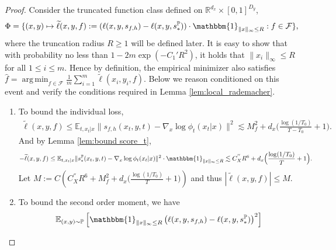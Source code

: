 \documentclass{article}
\numberwithin{equation}{section}
\newcommand{\E}{\mathbb{E}}
\newcommand{\R}{\mathbb{R}}
\DeclareMathOperator*{\argmin}{arg\,min}
\theoremstyle{definition}
\renewcommand{\P}{\mathbb{P}}
\begin{document}
\begin{proof}
    Consider the truncated function class defined on $\R^{d_x}\times[0,1]^{D_y}$,
    \begin{equation}
        \Phi=\{(x,y)\mapsto \widetilde{\ell}(x,y,f):=(\ell(x,y,s_{f,h})-\ell(x,y,s_*^\P))\cdot\mathbbm{1}_{\|x\|_\infty\leq R}:f\in\mathcal{F}\},
    \end{equation}
    where the truncation radius $R\geq 1$ will be defined later.
    It is easy to show that with probability no less than $1-2m\exp(-C_1'R^2)$, it holds that $\|x_i\|_\infty\leq R$ for all $1\leq i \leq m$.
    Hence by definition, the empirical minimizer also satisfies $\widehat{f}= \argmin_{f\in\mathcal{F}} \frac{1}{m}\sum_{i=1}^m \widetilde{\ell}(x_i,y_i,f)$.
    Below we reason conditioned on this event and verify the conditions required in Lemma \ref{lem:local_rademacher}. 
    \begin{enumerate}[label=\textbf{Step \arabic*.}]
        \item To bound the individual loss,
        \begin{equation}
            \begin{aligned}
                \widetilde{\ell}(x,y,f)
                \leq \E_{t,x_t|x}\|s_{f,h}(x_t,y,t)-\nabla_x\log \phi_t(x_t|x)\|^2
                \lesssim M_f^2+ d_x\Big(\frac{\log(1/T_0)}{T-T_0}+1\Big). 
            \end{aligned}
        \end{equation}
        And by Lemma \ref{lem:bound score_t},
        \begin{equation}
            \begin{aligned}
                -\widetilde{\ell}(x,y,f)
                \leq \E_{t,x_t|x}\|s_*^\P(x_t,y,t)-\nabla_x\log \phi_t(x_t|x)\|^2\cdot \mathbbm{1}_{\|x\|_\infty\leq R}
                \lesssim C_X^{''}R^6+ d_x\Big(\frac{\log(1/T_0)}{T}+1\Big). 
            \end{aligned}
        \end{equation}
        Let $M:=C\left(C_X^{''}R^6+M_f^2+d_x\Big(\frac{\log(1/T_0)}{T}+1\Big)\right)$ and thus $|\widetilde{\ell}(x,y,f)|\leq M$.
        \item To bound the second order moment, we have
            \begin{equation}
                \begin{aligned}
                    &\E_{(x,y)\sim\P} \left[\mathbbm{1}_{\|x\|_\infty\leq R} \left(\ell(x,y,s_{f,h})-\ell(x,y,s_*^\P)\right)^2\right] \\

\end{aligned}
\end{equation}
\end{enumerate}
\end{proof}
\end{document}

